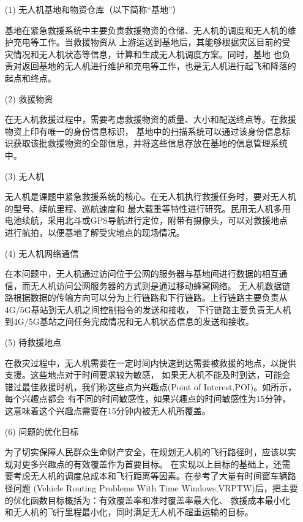 \begin{itemize}
	\item [(1)]  
	无人机基地和物资仓库（以下简称“基地”）


	\qquad 基地在紧急救援系统中主要负责救援物资的仓储、无人机的调度和无人机的维护充电等工作。当救援物资从
	上游运送到基地后，其能够根据灾区目前的受灾情况和无人机状态等信息，计算和生成无人机调度方案。同时，基地
	也负责对返回基地的无人机进行维护和充电等工作，也是无人机进行起飞和降落的起点和终点。

	\item[(2)]
	救援物资

	
	\qquad 在无人机救援过程中，需要考虑救援物资的质量、大小和配送终点等。在救援物资上印有唯一的身份信息标识，
	基地中的扫描系统可以通过该身份信息标识获取该批救援物资的全部信息，并将这些信息存放在基地的信息管理系统中。

	\item[(3)]
	无人机

	
	\qquad 无人机是课题中紧急救援系统的核心。在无人机执行救援任务时，要对无人机的型号、续航里程、巡航速度和
	最大载重等特性进行研究。民用无人机多用电池续航，采用北斗或GPS导航进行定位，附带有摄像头，可以对救援地点
	进行航拍，以便基地了解受灾地点的现场情况。

	\item[(4)]
	无人机网络通信

	\qquad 在本问题中，无人机通过访问位于公网的服务器与基地间进行数据的相互通信，而无人机访问公网服务器的方式则是通过移动蜂窝网络。
	无人机数据链路根据数据的传输方向可以分为上行链路和下行链路。上行链路主要负责从4G/5G基站到无人机之间控制指令的发送和接收，
	下行链路主要负责无人机到4G/5G基站之间任务完成情况和无人机状态信息的发送和接收。
	

	\item[(5)]
	待救援地点


	\qquad 在救灾过程中，无人机需要在一定时间内快速到达需要被救援的地点，以提供支援。这些地点对于时间要求较为敏感，
	如果无人机不能及时到达，可能会错过最佳救援时机，我们称这些点为兴趣点(Point of Interest,POI)。如所示，每个兴趣点都会
	有不同的时间敏感性，如果兴趣点的时间敏感性为15分钟，这意味着这个兴趣点需要在15分钟内被无人机所覆盖。

	\item[(6)]
	问题的优化目标

	\qquad 为了切实保障人民群众生命财产安全，在规划无人机的飞行路径时，应该以实现对更多兴趣点的有效覆盖作为首要目标。
	在实现以上目标的基础上，还需要考虑无人机的调度总成本和飞行距离等因素。在参考了大量有时间窗车辆路径问题
	(Vehicle Routing Problems With Time Windows,VRPTW)后，把主要的优化函数目标概括为：有效覆盖率和准时覆盖率最大化、
	救援成本最小化和无人机的飞行里程最小化，同时满足无人机不超重运输的目标。


\end{itemize}
